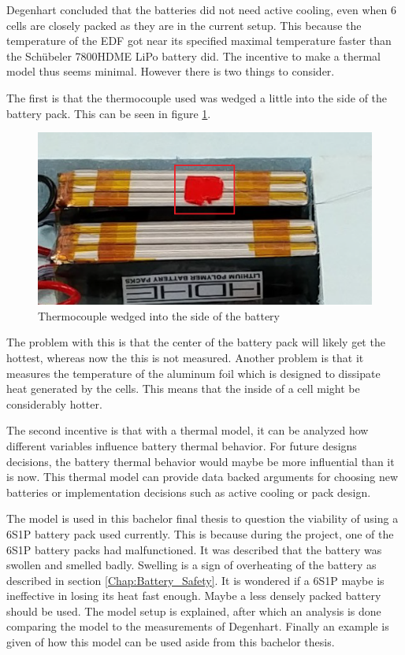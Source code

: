 Degenhart concluded that the batteries did not need active cooling, even when 6 cells are closely packed as they are in the current setup. This because the temperature of the EDF got near its specified maximal temperature faster than the Schübeler 7800HDME LiPo battery did. The incentive to make a thermal model thus seems minimal. However there is two things to consider. 

The first is that the thermocouple used was wedged a little into the side of the battery pack. This can be seen in figure \ref{Thermocouple}. 

\begin{figure} [H]
	\centering
	\includegraphics[width=0.5\linewidth]{Figures/Thermocouple.PNG}
	\caption{Thermocouple wedged into the side of the battery}
   \label{Thermocouple}
\end{figure}

The problem with this is that the center of the battery pack will likely get the hottest, whereas now the this is not measured. Another problem is that it measures the temperature of the aluminum foil which is designed to dissipate heat generated by the cells. This means that the inside of a cell might be considerably hotter.

The second incentive is that with a thermal model, it can be analyzed how different variables influence battery thermal behavior. For future designs decisions, the battery thermal behavior would maybe be more influential than it is now. This thermal model can provide data backed arguments for choosing new batteries or implementation decisions such as active cooling or pack design.

The model is used in this bachelor final thesis to question the viability of using a 6S1P battery pack used currently. This is because during the project, one of the 6S1P battery packs had malfunctioned. It was described that the battery was swollen and smelled badly. Swelling is a sign of overheating of the battery as described in section \ref{Chap:Battery_Safety}. It is wondered if a 6S1P maybe is ineffective in losing its heat fast enough. Maybe a less densely packed battery should be used. The model setup is explained, after which an analysis is done comparing the model to the measurements of Degenhart. Finally an example is given of how this model can be used aside from this bachelor thesis.


